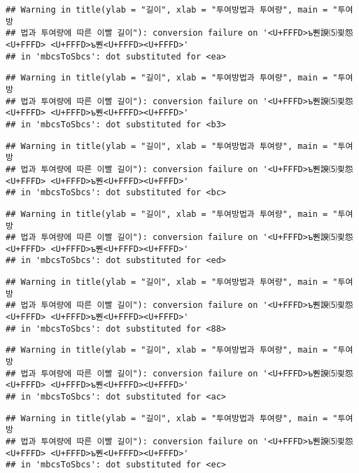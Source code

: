 \documentclass[]{article}
\begin{document}
\begin{verbatim}
## Warning in title(ylab = "길이", xlab = "투여방법과 투여량", main = "투여방
## 법과 투여량에 따른 이빨 길이"): conversion failure on '<U+FFFD>ъ뿬諛⑸쾿怨<U+FFFD> <U+FFFD>ъ뿬<U+FFFD><U+FFFD>'
## in 'mbcsToSbcs': dot substituted for <ea>
\end{verbatim}

\begin{verbatim}
## Warning in title(ylab = "길이", xlab = "투여방법과 투여량", main = "투여방
## 법과 투여량에 따른 이빨 길이"): conversion failure on '<U+FFFD>ъ뿬諛⑸쾿怨<U+FFFD> <U+FFFD>ъ뿬<U+FFFD><U+FFFD>'
## in 'mbcsToSbcs': dot substituted for <b3>
\end{verbatim}

\begin{verbatim}
## Warning in title(ylab = "길이", xlab = "투여방법과 투여량", main = "투여방
## 법과 투여량에 따른 이빨 길이"): conversion failure on '<U+FFFD>ъ뿬諛⑸쾿怨<U+FFFD> <U+FFFD>ъ뿬<U+FFFD><U+FFFD>'
## in 'mbcsToSbcs': dot substituted for <bc>
\end{verbatim}

\begin{verbatim}
## Warning in title(ylab = "길이", xlab = "투여방법과 투여량", main = "투여방
## 법과 투여량에 따른 이빨 길이"): conversion failure on '<U+FFFD>ъ뿬諛⑸쾿怨<U+FFFD> <U+FFFD>ъ뿬<U+FFFD><U+FFFD>'
## in 'mbcsToSbcs': dot substituted for <ed>
\end{verbatim}

\begin{verbatim}
## Warning in title(ylab = "길이", xlab = "투여방법과 투여량", main = "투여방
## 법과 투여량에 따른 이빨 길이"): conversion failure on '<U+FFFD>ъ뿬諛⑸쾿怨<U+FFFD> <U+FFFD>ъ뿬<U+FFFD><U+FFFD>'
## in 'mbcsToSbcs': dot substituted for <88>
\end{verbatim}

\begin{verbatim}
## Warning in title(ylab = "길이", xlab = "투여방법과 투여량", main = "투여방
## 법과 투여량에 따른 이빨 길이"): conversion failure on '<U+FFFD>ъ뿬諛⑸쾿怨<U+FFFD> <U+FFFD>ъ뿬<U+FFFD><U+FFFD>'
## in 'mbcsToSbcs': dot substituted for <ac>
\end{verbatim}

\begin{verbatim}
## Warning in title(ylab = "길이", xlab = "투여방법과 투여량", main = "투여방
## 법과 투여량에 따른 이빨 길이"): conversion failure on '<U+FFFD>ъ뿬諛⑸쾿怨<U+FFFD> <U+FFFD>ъ뿬<U+FFFD><U+FFFD>'
## in 'mbcsToSbcs': dot substituted for <ec>
\end{verbatim}
\end{document}
